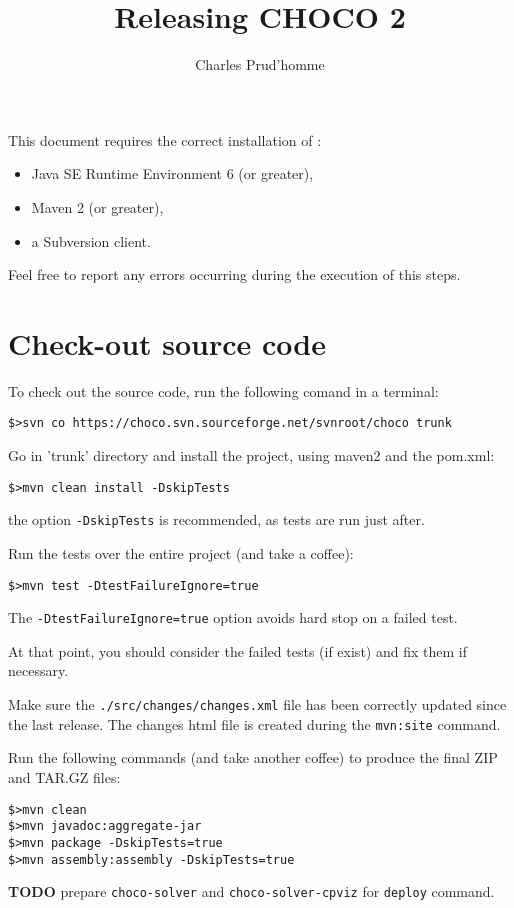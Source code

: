 \documentclass[11pt]{amsart}
\title{Releasing CHOCO 2}
\author{Charles Prud'homme}
\newcommand{\mylst}[1]{\lstinline|#1|}
\begin{document}
\maketitle

This document requires the correct installation of :
\begin{itemize}
\item Java SE Runtime Environment 6 (or greater),
\item Maven 2 (or greater),
\item a Subversion client.
\end{itemize}

Feel free to report any errors occurring during the execution of this steps.

\section{Check-out source code}

To check out the source code, run the following comand in a terminal:
\begin{lstlisting}
$>svn co https://choco.svn.sourceforge.net/svnroot/choco trunk
\end{lstlisting}

\vspace{.5cm}
Go in 'trunk' directory and install the project, using maven2 and the pom.xml:
\begin{lstlisting}
$>mvn clean install -DskipTests
\end{lstlisting}
the option \mylst{-DskipTests} is recommended, as tests are run just after. 

\vspace{.5cm}
Run the tests over the entire project (and take a coffee):
\begin{lstlisting}
$>mvn test -DtestFailureIgnore=true
\end{lstlisting}
The \mylst{-DtestFailureIgnore=true} option avoids hard stop on a failed test. 

At that point, you should consider the failed tests (if exist) and fix them if necessary. 

\vspace{.5cm}
Make sure the \mylst{./src/changes/changes.xml} file has been correctly updated since the last release. The changes html file is created during the \mylst{mvn:site} command. 

\vspace{.5cm}
Run the following commands (and take another coffee) to produce the final ZIP and TAR.GZ files:
\begin{lstlisting}
$>mvn clean
$>mvn javadoc:aggregate-jar
$>mvn package -DskipTests=true
$>mvn assembly:assembly -DskipTests=true
\end{lstlisting}

\textbf{TODO} prepare \mylst{choco-solver} and \mylst{choco-solver-cpviz} for \mylst{deploy} command.
\end{document}
